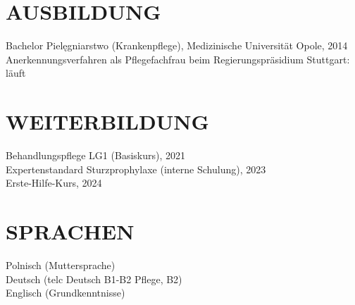 \documentclass[11pt,a4paper]{article}
\begin{document}
\section*{AUSBILDUNG}
Bachelor Pielęgniarstwo (Krankenpflege), Medizinische Universität Opole, 2014\\
Anerkennungsverfahren als Pflegefachfrau beim Regierungspräsidium Stuttgart: läuft

\section*{WEITERBILDUNG}
Behandlungspflege LG1 (Basiskurs), 2021\\
Expertenstandard Sturzprophylaxe (interne Schulung), 2023\\
Erste-Hilfe-Kurs, 2024

\section*{SPRACHEN}
Polnisch (Muttersprache)\\
Deutsch (telc Deutsch B1-B2 Pflege, B2)\\
Englisch (Grundkenntnisse)
\end{document}
